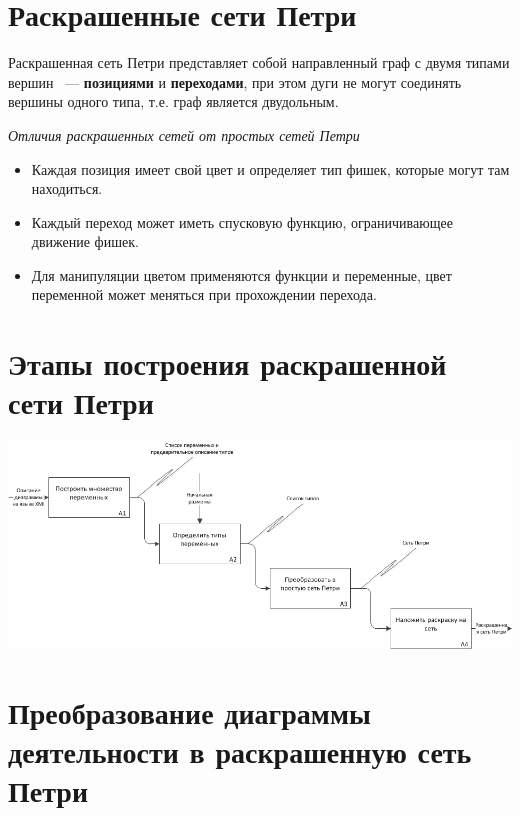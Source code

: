 \documentclass[12pt]{article}
\begin{document}
\section{Раскрашенные сети Петри }

Раскрашенная сеть Петри представляет собой направленный граф с двумя типами вершин ~--- \textbf{позициями} и \textbf{переходами}, при этом дуги не могут соединять вершины одного типа, т.е. граф является двудольным.

\emph{Отличия раскрашенных сетей от простых сетей Петри}

\begin{itemize}
\item Каждая позиция имеет свой цвет и определяет тип фишек, которые могут там находиться.
\item Каждый переход может иметь спусковую функцию, ограничивающее движение фишек.
\item Для манипуляции цветом применяются функции и переменные, цвет переменной может меняться при прохождении перехода.
\end{itemize}

\section{Этапы построения раскрашенной сети Петри }

\begin{center}
\includegraphics[width=\textwidth]{../tex/include/IDEF0ColoredPetri.png}
\end{center}

\section{Преобразование диаграммы деятельности в раскрашенную сеть  Петри}
\end{document}
